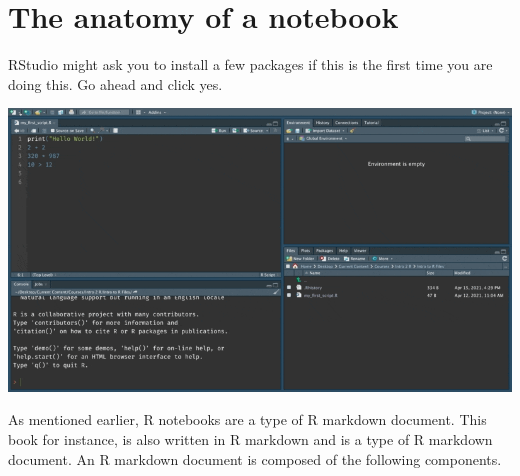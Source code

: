 \documentclass[
]{book}
\begin{document}
\hypertarget{the-anatomy-of-a-notebook}{%
\section{The anatomy of a notebook}\label{the-anatomy-of-a-notebook}}

RStudio might ask you to install a few packages if this is the first time you are doing this. Go ahead and click yes.

\includegraphics{assets/ch_2-notebooks/gifs/open_notebook.gif}

As mentioned earlier, R notebooks are a type of R markdown document. This book for instance, is also written in R markdown and is a type of R markdown document. An R markdown document is composed of the following components.
\end{document}
